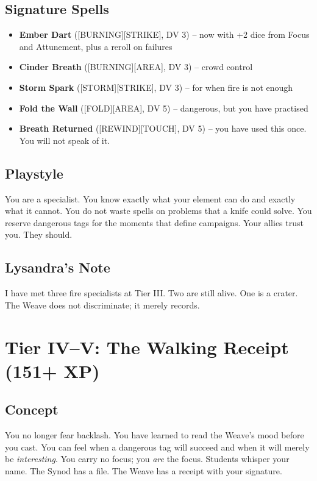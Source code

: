 \subsection{Signature Spells}

\begin{itemize}
    \item \textbf{Ember Dart} ([BURNING][STRIKE], DV 3) -- now with +2 dice from Focus and Attunement, plus a reroll on failures
    \item \textbf{Cinder Breath} ([BURNING][AREA], DV 3) -- crowd control
    \item \textbf{Storm Spark} ([STORM][STRIKE], DV 3) -- for when fire is not enough
    \item \textbf{Fold the Wall} ([FOLD][AREA], DV 5) -- dangerous, but you have practised
    \item \textbf{Breath Returned} ([REWIND][TOUCH], DV 5) -- you have used this once. You will not speak of it.
\end{itemize}

\subsection{Playstyle}

You are a specialist. You know exactly what your element can do and exactly what it cannot. You do not waste spells on problems that a knife could solve. You reserve dangerous tags for the moments that define campaigns. Your allies trust you. They should.

\subsection{Lysandra's Note}

I have met three fire specialists at Tier III. Two are still alive. One is a crater. The Weave does not discriminate; it merely records.

\section{Tier IV--V: The Walking Receipt (151+ XP)}

\subsection{Concept}

You no longer fear backlash. You have learned to read the Weave's mood before you cast. You can feel when a dangerous tag will succeed and when it will merely be \emph{interesting}. You carry no focus; you \emph{are} the focus. Students whisper your name. The Synod has a file. The Weave has a receipt with your signature.


